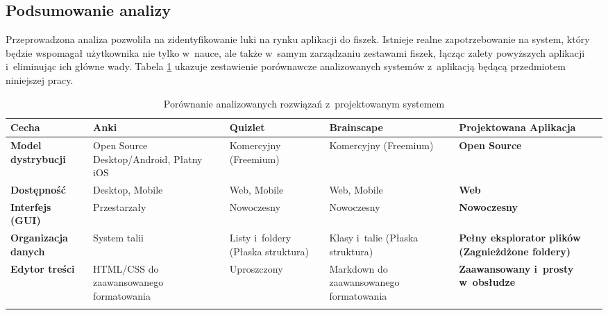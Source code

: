 \subsection*{Podsumowanie analizy}
Przeprowadzona analiza pozwoliła na zidentyfikowanie luki na rynku aplikacji do fiszek. Istnieje realne zapotrzebowanie 
na system, który będzie wspomagał użytkownika nie tylko w~nauce, ale także w~samym zarządzaniu zestawami fiszek, łącząc zalety 
powyższych aplikacji i~eliminując ich główne wady. Tabela \ref{tab:porownanie_rozwiazan} ukazuje zestawienie porównawcze 
analizowanych systemów z~aplikacją będącą przedmiotem niniejszej pracy.

\begin{table}[htbp]
    \centering
    \caption{Porównanie analizowanych rozwiązań z~projektowanym systemem}
    \label{tab:porownanie_rozwiazan}
    \footnotesize %
    \begin{tabularx}{\textwidth}{@{} p{2.2cm} X X X X @{}}
        \toprule
        \textbf{Cecha} & \textbf{Anki} & \textbf{Quizlet} & \textbf{Brainscape} & \textbf{Projektowana Aplikacja} \\
        \midrule
        
        \textbf{Model dystrybucji} & 
        Open Source Desktop/Android, Płatny iOS & 
        Komercyjny (Freemium) & 
        Komercyjny (Freemium) & 
        \textbf{Open Source} \\ 
        \addlinespace %
        
        \textbf{Dostępność} & 
        Desktop, Mobile & 
        Web, Mobile & 
        Web, Mobile & 
        \textbf{Web} \\ 
        \addlinespace
        
        \textbf{Interfejs (GUI)} & 
        Przestarzały & 
        Nowoczesny & 
        Nowoczesny & 
        \textbf{Nowoczesny} \\ 
        \addlinespace
        
        \textbf{Organizacja danych} & 
        System talii & 
        Listy i~foldery (Płaska struktura) & 
        Klasy i~talie (Płaska struktura) & 
        \textbf{Pełny eksplorator plików (Zagnieżdżone foldery)} \\ 
        \addlinespace
        
        \textbf{Edytor treści} & 
        HTML/CSS do zaawansowanego formatowania & 
        Uproszczony & 
        Markdown do zaawansowanego formatowania & 
        \textbf{Zaawansowany i~prosty w~obsłudze} \\ 
        \addlinespace
        
        \bottomrule
    \end{tabularx}
\end{table}

